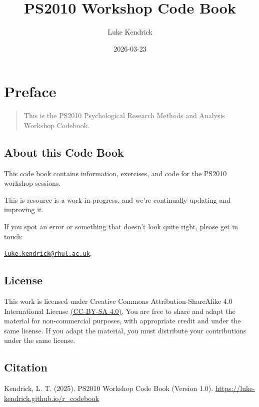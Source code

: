 \documentclass[
]{book}
\title{PS2010 Workshop Code Book}
\author{Luke Kendrick}
\date{2026-03-23}
\let\oldsection\section
\renewcommand{\section}{\needspace{5\baselineskip}\oldsection}
\begin{document}
\maketitle

{
\setcounter{tocdepth}{1}
\tableofcontents
}
\chapter*{Preface}\label{preface}

\begin{quote}
This is the PS2010 Psychological Research Methods and Analysis Workshop Codebook.
\end{quote}

\section{About this Code Book}\label{about-this-code-book}

This code book contains information, exercises, and code for the PS2010 workshop sessions.

This is resource is a work in progress, and we're continually updating and improving it.

If you spot an error or something that doesn't look quite right, please get in touch:

\href{mailto:luke.kendrick@rhul.ac.uk}{\nolinkurl{luke.kendrick@rhul.ac.uk}}.

\section{\texorpdfstring{\textbf{License}}{License}}\label{license}

This work is licensed under Creative Commons Attribution-ShareAlike 4.0 International License \href{https://creativecommons.org/licenses/by-sa/4.0/}{(CC-BY-SA 4.0)}. You are free to share and adapt the material for non-commercial purposes, with appropriate credit and under the same license. If you adapt the material, you must distribute your contributions under the same license.

\section{\texorpdfstring{\textbf{Citation}}{Citation}}\label{citation}

Kendrick, L. T. (2025). PS2010 Workshop Code Book (Version 1.0). \url{https://luke-kendrick.github.io/r_codebook}
\end{document}
